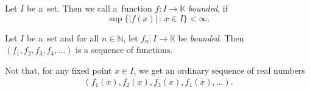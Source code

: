 

\begin{Definition}
 Let $I$ be a~set. %
Then we call a~function $f:I\rightarrow \mathbb{K}$ \emph{bounded}, if
\[\sup\{|f(x)|\,:\,x\in I\}<\infty.\]
\end{Definition}

\begin{Definition}
 Let $I$ be a~set  and for all $n \in \mathbb{N}$, let $f_n :I\rightarrow \mathbb{K}$ be \emph{bounded}.
 Then $(f_1, f_2, f_3, f_4, \dots)$ is a sequence of functions.
\end{Definition}

Not that, for any fixed point $x \in I$, we get an ordinary sequence of real numbers
\begin{align*}
(f_1(x), f_2(x), f_3(x), f_4(x), \dots).
\end{align*}

